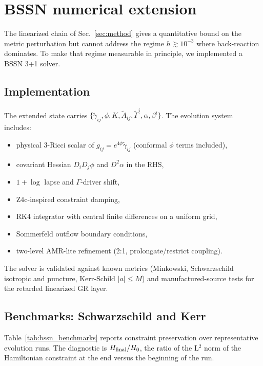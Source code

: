 \section{BSSN numerical extension}
\label{sec:bssn}

The linearized chain of Sec.~\ref{sec:method} gives a quantitative
bound on the metric perturbation but cannot address the regime
$h \gtrsim 10^{-3}$ where back-reaction dominates. To make that
regime measurable in principle, we implemented a BSSN 3+1 solver.

\subsection{Implementation}

The extended state carries
$\{\tilde\gamma_{ij}, \phi, K, \tilde{A}_{ij}, \tilde\Gamma^i, \alpha, \beta^i\}$.
The evolution system includes:

\begin{itemize}
\item physical 3-Ricci scalar of
      $g_{ij} = e^{4\phi}\tilde\gamma_{ij}$ (conformal $\phi$ terms included),
\item covariant Hessian $D_i D_j\phi$ and $D^2\alpha$ in the RHS,
\item $1{+}\log$ lapse and $\Gamma$-driver shift,
\item Z4c-inspired constraint damping,
\item RK4 integrator with central finite differences on a uniform grid,
\item Sommerfeld outflow boundary conditions,
\item two-level AMR-lite refinement (2:1, prolongate/restrict coupling).
\end{itemize}

The solver is validated against known metrics (Minkowski,
Schwarzschild isotropic and puncture, Kerr-Schild $|a| \le M$) and
manufactured-source tests for the retarded linearized GR layer.

\subsection{Benchmarks: Schwarzschild and Kerr}

Table~\ref{tab:bssn_benchmarks} reports constraint preservation over
representative evolution runs. The diagnostic is
$H_{\rm final}/H_0$, the ratio of the L$^2$ norm of the Hamiltonian
constraint at the end versus the beginning of the run.

